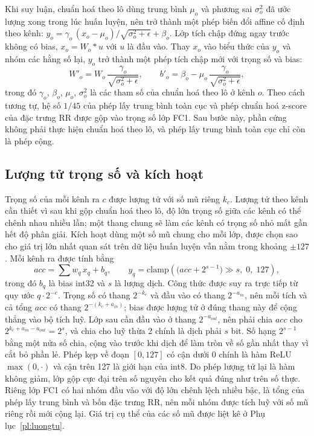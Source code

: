 Khi suy luận, chuẩn hoá theo lô dùng trung bình $\mu_o$ và phương sai $\sigma_o^2$ đã ước lượng xong trong lúc huấn luyện, nên trở thành một phép biến đổi affine cố định theo kênh:
$y_o=\gamma_o\,(x_o-\mu_o)/\sqrt{\sigma_o^2+\epsilon}+\beta_o$.
Lớp tích chập đứng ngay trước không có bias, $x_o=W_o\ast u$ với $u$ là đầu vào.
Thay $x_o$ vào biểu thức của $y_o$ và nhóm các hằng số lại, $y_o$ trở thành một phép tích chập mới với trọng số và bias:
\begin{equation}
  W'_o=W_o\,\frac{\gamma_o}{\sqrt{\sigma_o^2+\epsilon}},\qquad
  b'_o=\beta_o-\mu_o\,\frac{\gamma_o}{\sqrt{\sigma_o^2+\epsilon}},
  \label{eq:ch4-foldbn}
\end{equation}
trong đó $\gamma_o$, $\beta_o$, $\mu_o$, $\sigma_o^2$ là các tham số của chuẩn hoá theo lô ở kênh $o$.
Theo cách tương tự, hệ số $1/45$ của phép lấy trung bình toàn cục và phép chuẩn hoá z-score của đặc trưng RR được gộp vào trọng số lớp FC1.
Sau bước này, phần cứng không phải thực hiện chuẩn hoá theo lô, và phép lấy trung bình toàn cục chỉ còn là phép cộng.

\subsection{Lượng tử trọng số và kích hoạt}

Trọng số của mỗi kênh ra $c$ được lượng tử với số mũ riêng $k_c$.
Lượng tử theo kênh cần thiết vì sau khi gộp chuẩn hoá theo lô, độ lớn trọng số giữa các kênh có thể chênh nhau nhiều lần; một thang chung sẽ làm các kênh có trọng số nhỏ mất gần hết độ phân giải.
Kích hoạt dùng một số mũ chung cho mỗi lớp, được chọn sao cho giá trị lớn nhất quan sát trên dữ liệu huấn luyện vẫn nằm trong khoảng $\pm127$.
Mỗi kênh ra được tính bằng
\begin{equation}
  acc=\sum w_q\,x_q+b_q,\qquad
  y_q=\mathrm{clamp}\left(\big(acc+2^{s-1}\big)\gg s,\;0,\;127\right),
  \label{eq:ch4-requant}
\end{equation}
trong đó $b_q$ là bias int32 và $s$ là lượng dịch.
Công thức được suy ra trực tiếp từ quy ước $q\cdot2^{-e}$.
Trọng số có thang $2^{-k_c}$ và đầu vào có thang $2^{-a_{in}}$, nên mỗi tích và cả tổng $acc$ có thang $2^{-(k_c+a_{in})}$; bias được lượng tử ở đúng thang này để cộng thẳng vào bộ tích luỹ.
Lớp sau cần đầu vào ở thang $2^{-a_{out}}$, nên phải chia $acc$ cho $2^{k_c+a_{in}-a_{out}}=2^{s}$, và chia cho luỹ thừa 2 chính là dịch phải $s$ bit.
Số hạng $2^{s-1}$ bằng một nửa số chia, cộng vào trước khi dịch để làm tròn về số gần nhất thay vì cắt bỏ phần lẻ.
Phép kẹp về đoạn $[0,127]$ có cận dưới 0 chính là hàm ReLU $\max(0,\cdot)$ và cận trên 127 là giới hạn của int8.
Do phép lượng tử lại là hàm không giảm, lớp gộp cực đại trên số nguyên cho kết quả đúng như trên số thực.
Riêng lớp FC1 có hai nhóm đầu vào với độ lớn chênh lệch nhiều bậc, là tổng của phép lấy trung bình và bốn đặc trưng RR, nên mỗi nhóm được tích luỹ với số mũ riêng rồi mới cộng lại.
Giá trị cụ thể của các số mũ được liệt kê ở Phụ lục~\ref{pl:luongtu}.

